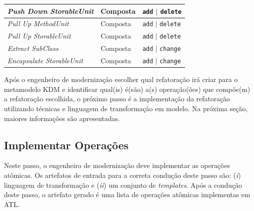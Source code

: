 \begin{table}[h]
\begin{center}
\begin{tabular}{ | m{4.5cm} | m{2.5cm} | m{4cm}| }
\hline
\textit{Push Down StorableUnit} &  Composta & \texttt{add} $|$ \texttt{delete}\\ 
\hline
\textit{Pull Up MethodUnit} &  Composta & \texttt{add} $|$ \texttt{delete}\\
\hline
\textit{Pull Up StorableUnit} &  Composta & \texttt{add} $|$ \texttt{delete}\\
\hline
\textit{Extract SubClass} &  Composta & \texttt{add} $|$ \texttt{change}\\
\hline
\textit{Encapsulate StorableUnit} &  Composta & \texttt{add} $|$ \texttt{change}\\
\hline
\end{tabular}
\end{center}
\end{table}

Após o engenheiro de modernização escolher qual refatoração irá criar para o metamodelo KDM e identificar qual(is) é(são) a(s) operação(ões) que compõe(m) a refatoração escolhida, o próximo passo é a implementação da refatoração utilizando técnicas e linguagem de transformação em modelo. Na próxima seção, maiores informações são apresentadas.

\subsection{Implementar Operações}\label{sec:linguagemDeTransformacaoUtilizada}




Neste passo, o engenheiro de modernização deve implementar as operações atômicas. Os artefatos de entrada para a correta condução deste passo são: (\textit{i}) linguagem de transformação e (\textit{ii}) um conjunto de \textit{templates}. Após a condução deste passo, o artefato gerado é uma lista de operações atômicas implementas em ATL. 

